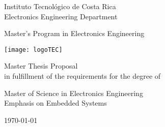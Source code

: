
\thispagestyle{empty} 

\begin{center}

Instituto Tecnol\'ogico de Costa Rica \\
Electronics Engineering Department

Master's Program in Electronics Engineering

\par\vspace{20mm}

\texttt{[image: logoTEC]}

\par\vspace*{\fill}

{\LARGE\bf{\textsf{\scriptTitle}}}

\par\vspace*{\fill}

Master Thesis {\sf Proposal} \\ 
in fulfillment of the requirements for the degree of

Master of Science in Electronics Engineering \\
Emphasis on Embedded Systems

\par\vspace{20mm}

\scriptAuthor

\vspace*{\fill}

{\today}

\end{center}
\newpage 
\cleardoublepage  

